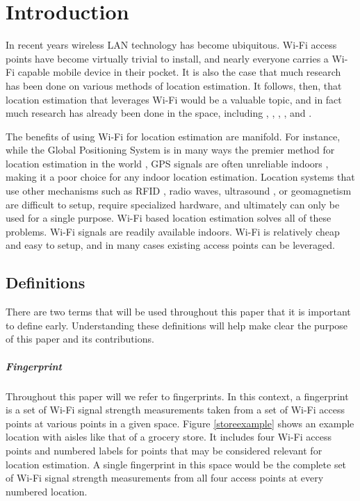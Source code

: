 \chapter{Introduction}
\label{introduction}
%


In recent years wireless LAN technology has become ubiquitous. Wi-Fi access points have become virtually trivial to install, and nearly everyone carries a Wi-Fi capable mobile device in their pocket. It is also the case that much research has been done on various methods of location estimation. It follows, then, that location estimation that leverages Wi-Fi would be a valuable topic, and in fact much research has already been done in the space, including \cite{ito2005bayesian}, \cite{liu2007survey}, \cite{kawaguchi2009wifi}, \cite{hotta2012robust}, and \cite{nagaosa2012dept}. 

The benefits of using Wi-Fi for location estimation are manifold. For instance, while the Global Positioning System is in many ways the premier method for location estimation in the world \cite{bajaj2002gps}, GPS signals are often unreliable indoors \cite{xiong2012towards}, making it a poor choice for any indoor location estimation. Location systems that use other mechanisms such as RFID \cite{toplan2012rfid}, radio waves, ultrasound \cite{priyantha2005cricket}, or geomagnetism \cite{chung2011indoor} are difficult to setup, require specialized hardware, and ultimately can only be used for a single purpose. Wi-Fi based location estimation solves all of these problems. Wi-Fi signals are readily available indoors. Wi-Fi is relatively cheap and easy to setup, and in many cases existing access points can be leveraged.

\section{Definitions}
%

There are two terms that will be used throughout this paper that it is important to define early. Understanding these definitions will help make clear the purpose of this paper and its contributions. 

\paragraph{Fingerprint}
Throughout this paper will we refer to fingerprints. In this context, a fingerprint is a set of Wi-Fi signal strength measurements taken from a set of Wi-Fi access points at various points in a given space. Figure \ref{storeexample} shows an example location with aisles like that of a grocery store. It includes four Wi-Fi access points and numbered labels for points that may be considered relevant for location estimation. A single fingerprint in this space would be the complete set of Wi-Fi signal strength measurements from all four access points at every numbered location. 

